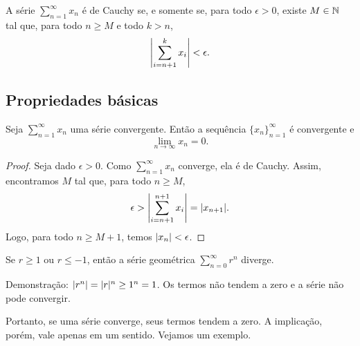 \begin{prop} \label{prop:cachyser}
A série $\sum_{n=1}^\infty x_n$ é de Cauchy
se, e somente se, para todo $\epsilon > 0$,
existe $M \in {\mathbb{N}}$ tal que, para todo $n \geq M$
e todo $k > n$,
\begin{equation*}
\left\lvert { \sum_{i={n+1}}^k x_i } \right\rvert
< \epsilon .
\end{equation*}
\end{prop}

\subsection{Propriedades básicas}

\begin{prop}
Seja $\sum_{n=1}^\infty x_n$ uma série convergente. Então
a sequência $\{ x_n \}_{n=1}^\infty$ é convergente e
\begin{equation*}
\lim_{n\to\infty} x_n = 0.
\end{equation*}
\end{prop}

\begin{proof}
Seja dado $\epsilon > 0$. Como $\sum_{n=1}^\infty x_n$ converge, ela é de Cauchy.
Assim, encontramos $M$ tal que, para todo $n \geq M$,
\begin{equation*}
\epsilon > 
\left\lvert { \sum_{i={n+1}}^{n+1} x_i } \right\rvert
=
\lvert { x_{n+1} } \rvert .
\end{equation*}
Logo, para todo $n \geq M+1$, temos $\lvert {x_{n}} \rvert < \epsilon$.
\end{proof}

\begin{example}
Se $r \geq 1$ ou $r \leq -1$, então a série geométrica $\sum_{n=0}^\infty r^n$
diverge.

Demonstração: $\lvert {r^n} \rvert = \lvert {r} \rvert^n \geq 1^n = 1$. Os termos não tendem a zero
e a série não pode convergir.
\end{example}

Portanto, se uma série converge, seus termos tendem a zero.
A implicação, porém, vale apenas em um sentido.
Vejamos um exemplo.

